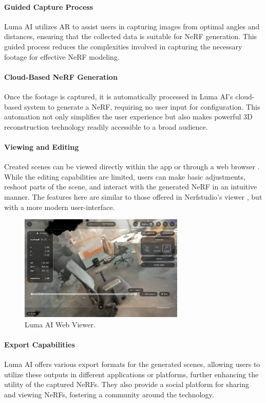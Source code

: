 \paragraph{Guided Capture Process}
Luma AI utilizes AR to assist users in capturing images from optimal angles and distances, ensuring that the collected data is suitable for NeRF generation.
This guided process reduces the complexities involved in capturing the necessary footage for effective NeRF modeling.

\paragraph{Cloud-Based NeRF Generation}
Once the footage is captured, it is automatically processed in Luma AI’s cloud-based system to generate a NeRF, requiring no user input for configuration.
This automation not only simplifies the user experience but also makes powerful 3D reconstruction technology readily accessible to a broad audience.

\paragraph{Viewing and Editing}
Created scenes can be viewed directly within the app or through a web browser . 
While the editing capabilities are limited, users can make basic adjustments, reshoot parts of the scene, and interact with the generated NeRF in an intuitive manner.
The features here are similar to those offered in Nerfstudio's viewer , but with a more modern user-interface.

\begin{figure}[h!]
  \centering
  \includegraphics[width=0.7\textwidth]{figures/related-luma.png}
  \caption{Luma AI Web Viewer.}
  \label{fig:luma-viewer}
\end{figure}

\paragraph{Export Capabilities}
Luma AI offers various export formats for the generated scenes, allowing users to utilize these outputs in different applications or platforms, further enhancing the utility of the captured NeRFs.
They also provide a social platform for sharing and viewing NeRFs, fostering a community around the technology.

